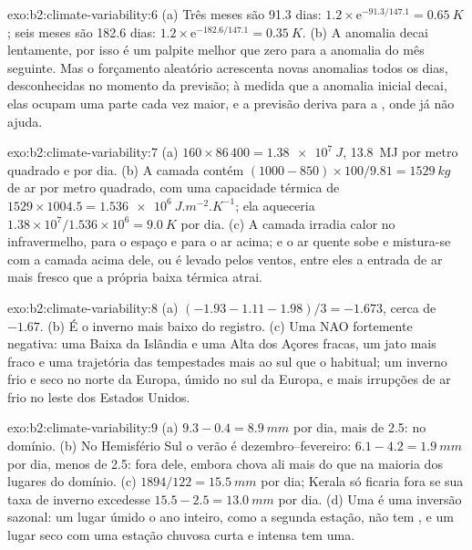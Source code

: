 \begin{solution}{exo:b2:climate-variability:6}
(a) Três meses são 91.3 dias: $1.2 \times \mathrm{e}^{-91.3/147.1} = \qty{0.65}{K}$; seis meses
são 182.6 dias: $1.2 \times \mathrm{e}^{-182.6/147.1} = \qty{0.35}{K}$. (b) A anomalia decai
lentamente, por isso é um palpite melhor que zero para a anomalia do mês seguinte. Mas o forçamento aleatório acrescenta
novas anomalias todos os dias, desconhecidas no momento da previsão; à medida que a anomalia inicial decai,
elas ocupam uma parte cada vez maior, e a previsão deriva para a , onde já não
ajuda.
\end{solution}

\begin{solution}{exo:b2:climate-variability:7}
(a) $160 \times 86\,400 = \qty{1.38e7}{J}$, \qty{13.8}{MJ} por metro quadrado e por dia. (b) A
camada contém $(1000 - 850) \times 100/9.81 = \qty{1529}{kg}$ de ar por metro quadrado, com uma capacidade
térmica de $1529 \times 1004.5 = \qty{1.536e6}{J.m^{-2}.K^{-1}}$; ela aqueceria $1.38 \times
10^7/1.536 \times 10^6 = \qty{9.0}{K}$ por dia. (c) A camada irradia calor no infravermelho, para o
espaço e para o ar acima; e o ar quente sobe e mistura-se com a camada acima dele, ou é
levado pelos ventos, entre eles a entrada de ar mais fresco que a própria baixa térmica atrai.
\end{solution}

\begin{solution}{exo:b2:climate-variability:8}
(a) $(-1.93 - 1.11 - 1.98)/3 = -1.673$, cerca de $-1.67$. (b) É o inverno mais baixo do registro.
(c) Uma NAO fortemente negativa: uma Baixa da Islândia e uma Alta dos Açores fracas, um jato mais fraco e uma trajetória das tempestades
mais ao sul que o habitual; um inverno frio e seco no norte da Europa, úmido no sul da Europa,
e mais irrupções de ar frio no leste dos Estados Unidos.
\end{solution}

\begin{solution}{exo:b2:climate-variability:9}
(a) $9.3 - 0.4 = \qty{8.9}{mm}$ por dia, mais de 2.5: no domínio. (b) No Hemisfério Sul
o verão é dezembro--fevereiro: $6.1 - 4.2 = \qty{1.9}{mm}$ por dia, menos de 2.5: fora dele,
embora chova ali mais do que na maioria dos lugares do domínio. (c) $1894/122 = \qty{15.5}{mm}$ por
dia; Kerala só ficaria fora se sua taxa de inverno excedesse $15.5 - 2.5 = \qty{13.0}{mm}$ por dia.
(d) Uma  é uma inversão sazonal: um lugar úmido o ano inteiro, como a segunda
estação, não tem , e um lugar seco com uma estação chuvosa curta e intensa tem uma.
\end{solution}


